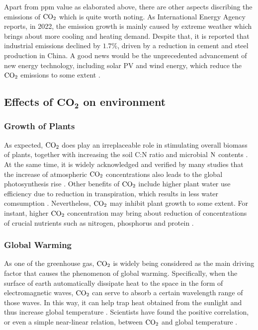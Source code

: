 \documentclass[12pt,a4paper]{article}
\begin{document}
    Apart from ppm value as elaborated above, there are other aspects discribing the emissions of $\ce{CO2}$ which is quite worth noting. As International Energy Agency reports, in 2022, the emission growth is mainly caused by extreme weather which brings about more cooling and heating demand. Despite that, it is reported that industrial emissions declined by $1.7\%$, driven by a reduction in cement and steel production in China. A good news would be the unprecedented advancement of new energy technology, including solar PV and wind energy, which reduce the $\ce{CO2}$ emissions to some extent \autocite{iea_co2_2023}.
    
    \subsection{Effects of $\mathbf{CO_2}$ on environment}
    \subsubsection{Growth of Plants}
    As expected, $\ce{CO2}$ does play an irreplaceable role in stimulating overall biomass of plants, together with increasing the soil C:N ratio and microbial $\ce{N}$ contents \autocite{de_graaff_interactions_2006}. At the same time, it is widely acknowledged and verified by many studies that the increase of atmospheric $\ce{CO2}$ concentrations also leads to the global photosynthesis rise \autocite{qi-de_effects_1992}\autocite{campbell_effects_1988}\autocite{kramer_carbon_1981}. Other benefits of $\ce{CO2}$ include higher plant water use efficiency due to reduction in transpiration, which results in less water comsumption \autocite{prior_review_2011}. Nevertheless, $\ce{CO2}$ may inhibit plant growth to some extent. For instant, higher $\ce{CO2}$ concentration may bring about reduction of concentrations of crucial nutrients such as nitrogen, phosphorus and protein \autocite{conroy_influence_1992}.
    \subsubsection{Global Warming}
    As one of the greenhouse gas, $\ce{CO2}$ is widely being considered as the main driving factor that causes the phenomenon of global warming. Specifically, when the surface of earth automatically dissipate heat to the space in the form of electromagnetic waves, $\ce{CO2}$ can serve to absorb a certain wavelength range of those waves. In this way, it can help trap heat obtained from the sunlight and thus increase global temperature \autocite{seim_influence_2020}. Scientists have found the positive correlation, or even a simple near-linear relation, between $\ce{CO2}$ and global temperature \autocite{matthews_proportionality_2009}.
\end{document}

